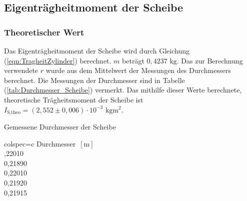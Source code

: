   \subsection{Eigenträgheitmoment der Scheibe}
    \subsubsection{Theoretischer Wert}
    Das Eigenträgheitmoment der Scheibe wird durch Gleichung (\ref{eqn:TragheitZylinder}) berechnet. $m$ beträgt $0,4237 \,\,\unit{\kilo\gram}$.
    Das zur Berechnung verwendete $r$ wurde aus dem Mittelwert der Messungen des Durchmessers berechnet. 
    Die Messungen der Durchmesser sind in Tabelle (\ref{tab:Durchmesser_Scheibe}) vermerkt. Das mithilfe dieser Werte berechnete, theoretische 
    Trägheitsmoment der Scheibe ist $I_{\text{S,theo}} = (2,552 \pm 0,006) \cdot 10^{-3} \,\,\unit{\kilo\gram\meter\squared}$. 
    \begin{table}[H]
      \centering 
      \caption{Gemessene Durchmesser der Scheibe}
      \label{tab:Durchmesser_Scheibe}
      \begin{tblr}{colspec={c}}
          \toprule
          Durchmesser $\,[\unit{\meter}]$ \\
          ,22010 \\
          0,21890 \\
          0,22010 \\
          0,21920 \\
          0,21915 \\
          \bottomrule
      \end{tblr}
    \end{table}

